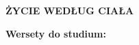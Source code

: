 \documentclass[10pt,a4paper,oneside]{article}
\begin{document}
\centerline{\textbf{\MakeUppercase{Życie według ciała}}}
\begin{center}
\textbf{Wersety do studium:} 

\end{center}
\end{document}
